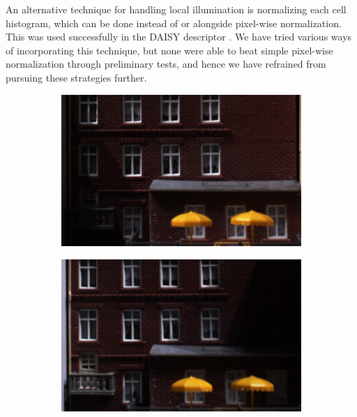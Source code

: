 \documentclass[thesis.tex]{subfiles}
\begin{document}
An alternative technique for handling local illumination is normalizing each cell histogram, which can be done instead of or alongside pixel-wise normalization. This was used successfully in the DAISY descriptor \cite{tola2008fast}. We have tried various ways of incorporating this technique, but none were able to beat simple pixel-wise normalization through preliminary tests, and hence we have refrained from pursuing these strategies further.
%
\begin{figure}[p]
    \centering
    \begin{subfigure}[t]{0.48\textwidth}
        \includegraphics[width=\textwidth]{img/pixelNormalizationExample1.png}
        \caption{}
        \label{fig:pixelNormalizationExample1}
    \end{subfigure}
    \begin{subfigure}[t]{0.48\textwidth}
        \includegraphics[width=\textwidth]{img/pixelNormalizationExample2.png}
        \caption{}
        \label{fig:pixelNormalizationExample2}

\end{subfigure}
\end{figure}
\end{document}
